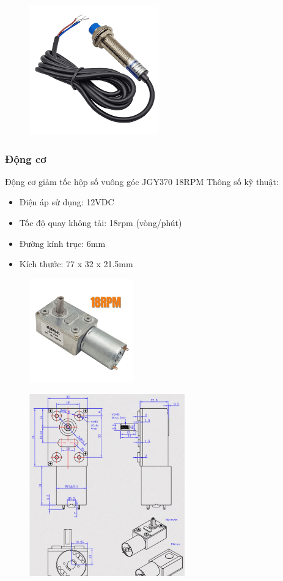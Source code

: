 \begin{figure}[H]
    \centering
    \includegraphics[width=0.5\textwidth]{pictures/Sensor.png}
\end{figure}
\cleardoublepage



\subsubsection{Động cơ}
Động cơ giảm tốc hộp số vuông góc JGY370 18RPM
Thông số kỹ thuật:
\begin{itemize}
    \item Điện áp sử dụng: 12VDC
    \item Tốc độ quay không tải: 18rpm (vòng/phút)
    \item Đường kính trục: 6mm
    \item Kích thước: 77 x 32 x 21.5mm
\end{itemize}
\begin{figure}[H]
    \centering
    \includegraphics[width=0.4\textwidth]{pictures/motor.png}
\end{figure}
\begin{figure}[H]
    \centering
    \includegraphics[width=0.6\textwidth]{pictures/dongco.png}
\end{figure}
